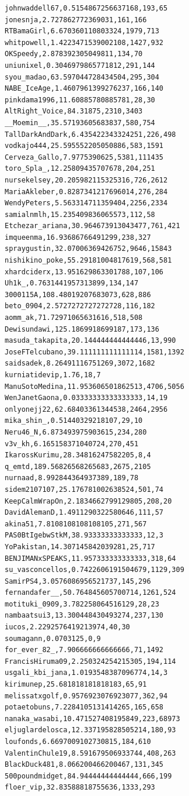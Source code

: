 \begin{verbatim}
johnwaddell67,0.5154867256637168,193,65
jonesnja,2.727862772369031,161,166
RTBamaGirl,6.670360110803324,1979,713
whitpowell,1.4223471539002108,1427,932
OKSpeedy,2.878392305049811,134,70
uniunixel,0.3046979865771812,291,144
syou_madao,63.597044728434504,295,304
NABE_IceAge,1.4607961399276237,166,140
pinkdama1996,11.60885780885781,28,30
AltRight_Voice,84.31875,2310,3403
__Moemin__,35.57193605683837,580,754
TallDarkAndDark,6.435422343324251,226,498
vodkajo444,25.595552205050886,583,1591
Cerveza_Gallo,7.9775390625,5381,111435
toro_Spla_,12.25809435707678,204,251
nursekelsey,20.205982115325316,726,2612
MariaAkleber,0.8287341217696014,276,284
WendyPeters,5.563314711359404,2256,2334
samialnmlh,15.235409836065573,112,58
Etchezar_ariana,30.964673913043477,761,421
imqueenma,16.93686766491299,238,327
spraygustin,32.07006369426752,9646,15843
nishikino_poke,55.29181004817619,568,581
xhardciderx,13.951629863301788,107,106
Uh1k_,0.7631441957313899,134,147
3000115A,108.48019207683073,628,886
beto_0904,2.5727272727272728,116,182
aomm_ak,71.72971065631616,518,508
Dewisundawi,125.1869918699187,173,136
masuda_takapita,20.144444444444446,13,990
JoseFTelcubano,39.111111111111114,1581,1392
saidsadek,8.26491116751269,3072,1682
kurniatidevip,1.76,18,7
ManuSotoMedina,11.953606501862513,4706,5056
WenJanetGaona,0.03333333333333333,14,19
onlyonejj22,62.68403361344538,2464,2956
mika_shin_,0.51440329218107,29,10
Neru46_N,6.873493975903615,234,280
v3v_kh,6.165158371040724,270,451
IkarossKurimu,28.34816247582205,8,4
q_emtd,189.56826568265683,2675,2105
nurnaad,8.992844364937389,189,78
sidem2107107,25.176781002638524,501,74
KeepCalmWrapOn,2.1834662799129805,208,20
DavidAlemanD,1.4911290322580646,111,57
akina51,7.8108108108108105,271,567
PAS0BtIgebwStkM,38.93333333333333,12,3
YoPakistan,14.307145842039281,25,717
BENJIMANxSPEAKS,11.957333333333333,318,64
su_vasconcellos,0.7422606191504679,1129,309
SamirPS4,3.0576086956521737,145,296
fernandafer__,50.764845605700714,1261,524
motituki_0909,3.782258064516129,28,23
nambaatsui3,13.300448430493274,237,130
iucos,2.2292576419213974,40,30
soumagann,0.0703125,0,9
for_ever_82_,7.906666666666666,71,1492
FrancisHiruma09,2.250324254215305,194,114
usgali_kbi_jana,1.0193548387096774,14,3
kirimunep,25.681818181818183,65,91
melissatxgolf,0.9576923076923077,362,94
potaetobuns,7.2284105131414265,165,658
nanaka_wasabi,10.471527408195849,223,68973
eljuglardelosca,12.337195828505214,180,93
loufonds,6.6697009102730815,184,610
ValentinChule19,8.591679506933744,408,263
BlackDuck481,8.066200466200467,131,345
500poundmidget,84.94444444444444,666,199
floer_vip,32.83588818755636,1333,293

\end{verbatim}
